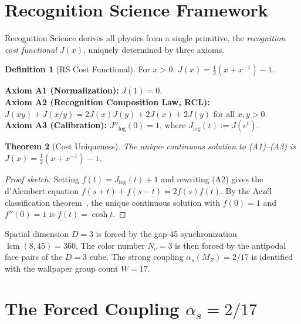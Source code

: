 \documentclass[12pt,a4paper]{article}
\newtheorem{theorem}{Theorem}[section]
\theoremstyle{definition}
\newtheorem{definition}[theorem]{Definition}
\theoremstyle{remark}
\begin{document}
\section{Recognition Science Framework}
\label{sec:framework}

Recognition Science derives all physics from a single primitive,
the \emph{recognition cost functional} $J(x)$, uniquely determined
by three axioms.

\begin{definition}[RS Cost Functional]
For $x > 0$: $J(x) = \tfrac{1}{2}(x + x^{-1}) - 1$.
\end{definition}

\noindent\textbf{Axiom A1 (Normalization):} $J(1) = 0$.\\
\textbf{Axiom A2 (Recognition Composition Law, RCL):}
$J(xy) + J(x/y) = 2J(x)J(y) + 2J(x) + 2J(y)$ for all $x, y > 0$.\\
\textbf{Axiom A3 (Calibration):} $J''_{\log}(0) = 1$, where
$J_{\log}(t) := J(e^t)$.

\begin{theorem}[Cost Uniqueness]
\label{thm:unique}
The unique continuous solution to \textup{(A1)--(A3)} is
$J(x) = \tfrac{1}{2}(x + x^{-1}) - 1$.
\end{theorem}

\begin{proof}[Proof sketch]
Setting $f(t) = J_{\log}(t) + 1$ and rewriting \textup{(A2)} gives the
d'Alembert equation $f(s+t) + f(s-t) = 2f(s)f(t)$.  By the Acz\'el
classification theorem~\cite{Aczel1966}, the unique continuous solution
with $f(0) = 1$ and $f''(0) = 1$ is $f(t) = \cosh t$.
\end{proof}

\noindent Spatial dimension $D = 3$ is forced by the gap-45 synchronization
$\operatorname{lcm}(8,45) = 360$.  The color number $N_c = 3$ is then
forced by the antipodal face pairs of the $D = 3$ cube.  The strong coupling
$\alpha_s(M_Z) = 2/17$ is identified with the wallpaper group count $W = 17$.

\section{The Forced Coupling $\alpha_s = 2/17$}
\label{sec:alpha}
\end{document}
